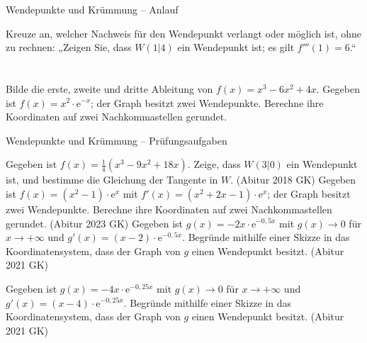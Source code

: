 \begin{aufgabe}{Wendepunkte und Krümmung – Anlauf}
\begin{teile}
\teil Kreuze an, welcher Nachweis für den Wendepunkt verlangt oder möglich ist, ohne zu rechnen: „Zeigen Sie, dass $W(1 | 4)$ ein Wendepunkt ist; es gilt $f'''(1) = 6$.“ \\  \\  \\ 
\teil Bilde die erste, zweite und dritte Ableitung von $f(x) = x^3 - 6x^2 + 4x$.
\teil Gegeben ist $f(x) = x^2 \cdot \mathrm{e}^{-x}$; der Graph besitzt zwei Wendepunkte. Berechne ihre Koordinaten auf zwei Nachkommastellen gerundet.
\end{teile}
\end{aufgabe}

\begin{aufgabe}{Wendepunkte und Krümmung – Prüfungsaufgaben}
\begin{teile}
\teil Gegeben ist $f(x) = \frac{1}{4}(x^3 - 9x^2 + 18x)$. Zeige, dass $W(3 | 0)$ ein Wendepunkt ist, und bestimme die Gleichung der Tangente in $W$. \hfill (Abitur 2018 GK)
\teil Gegeben ist $f(x) = (x^2 - 1) \cdot \mathrm{e}^{x}$ mit $f'(x) = (x^2 + 2x - 1) \cdot \mathrm{e}^{x}$; der Graph besitzt zwei Wendepunkte. Berechne ihre Koordinaten auf zwei Nachkommastellen gerundet. \hfill (Abitur 2023 GK)
\teil Gegeben ist $g(x) = -2x \cdot \mathrm{e}^{-0{,}5x}$ mit $g(x) \to 0$ für $x \to +\infty$ und $g'(x) = (x - 2) \cdot \mathrm{e}^{-0{,}5x}$. Begründe mithilfe einer Skizze in das Koordinatensystem, dass der Graph von $g$ einen Wendepunkt besitzt. \hfill (Abitur 2021 GK)

\begin{ksys}[xmin=-1,xmax=10,ymin=-2,ymax=1] \end{ksys}
\teil Gegeben ist $g(x) = -4x \cdot \mathrm{e}^{-0{,}25x}$ mit $g(x) \to 0$ für $x \to +\infty$ und $g'(x) = (x - 4) \cdot \mathrm{e}^{-0{,}25x}$. Begründe mithilfe einer Skizze in das Koordinatensystem, dass der Graph von $g$ einen Wendepunkt besitzt. \hfill (Abitur 2021 GK)

\begin{ksys}[xmin=-1,xmax=16,ymin=-7,ymax=1,xstep=2] \end{ksys}
\end{teile}
\end{aufgabe}


